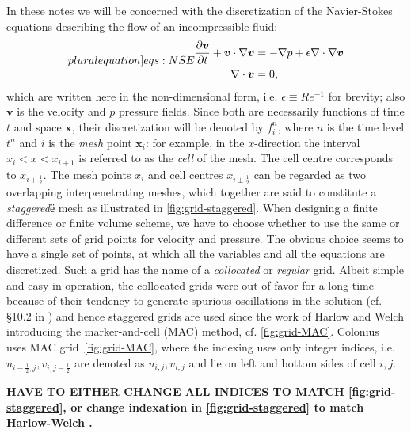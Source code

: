 \documentclass{article}
\numberwithin{equation}{section}
\begin{document}
In these notes we will be concerned with the discretization of the Navier-Stokes equations describing the flow of an incompressible fluid:
\begin{subequations}
\label[pluralequation]{eqs:NSE}
\begin{align}
\label{eqn:momentum-intro}
\frac{\partial \boldsymbol{v}}{\partial t} + \boldsymbol{v} \cdot \nabla \boldsymbol{v} &= -\nabla p + \epsilon \nabla \cdot \nabla \boldsymbol{v} \\
\label{eqn:continuity}
\nabla \cdot \boldsymbol{v} &= 0,
\end{align}
\end{subequations}
which are written here in the non-dimensional form, i.e. $\epsilon \equiv Re^{-1}$ for brevity; also $\boldsymbol{v}$ is the velocity and $p$ pressure fields. 
Since both are necessarily functions of time $t$ and space $\boldsymbol{x}$, their discretization will be denoted by $f^{n}_{i}$, where $n$ is the time level $t^{n}$ and $i$ is the \textit{mesh} point $\boldsymbol{x}_{i}$: for example, in the $x$-direction the interval $x_{i} < x < x_{i+1}$ is referred to as the \textit{cell} of the mesh. 
The cell centre corresponds to $x_{i+\frac{1}{2}}$. 
The mesh points $x_{i}$ and cell centres $x_{i \pm \frac{1}{2}}$ can be regarded as two overlapping interpenetrating meshes, which together are said to constitute a \textit{staggered}ё mesh as illustrated in \cref{fig:grid-staggered}. 
When designing a finite difference or finite volume scheme, we have to choose whether to use the same or different sets of grid points for velocity and pressure. 
The obvious choice seems to have a single set of points, at which all the variables and all the equations are discretized. 
Such a grid has the name of a \textit{collocated} or \textit{regular} grid. 
Albeit simple and easy in operation, the collocated grids were out of favor for a long time because of their tendency to generate spurious oscillations in the solution (cf. \S 10.2 in \cite{Zikanov:2010}) and hence staggered grids are used since the work of Harlow and Welch \cite{Harlow:1965} introducing the marker-and-cell (MAC) method, cf. \cref{fig:grid-MAC}. 
Colonius~\cite{Colonius:2008} uses MAC grid~\cref{fig:grid-MAC}, where the indexing uses only integer indices, i.e.  $u_{i-\frac{1}{2},j},v_{i,j-\frac{1}{2}}$ are denoted as $u_{i,j},v_{i,j}$ and lie on left and bottom sides of cell $i,j$.  

\textbf{HAVE TO EITHER CHANGE ALL INDICES TO MATCH \cref{fig:grid-staggered}, or change indexation in \cref{fig:grid-staggered} to match Harlow-Welch \cite{Harlow:1965}.}
\end{document}
